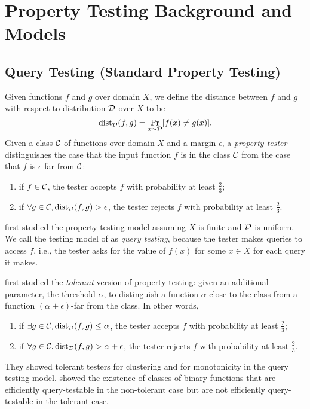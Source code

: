 \section{Property Testing Background and Models}
\label{sec:model}
\subsection{Query Testing (Standard Property Testing)}
Given functions $f$ and $g$ over domain $X$, we define the distance between $f$ and $g$ with respect to distribution ${\mathcal{D}}$ over $X$ to be
\begin{equation}
{\mathrm{dist}}_{\mathcal{D}}(f,g)=\Pr_{x\sim{\mathcal{D}}}[f(x)\neq g(x)].
\end{equation}
Given a class ${\mathcal{C}}$ of functions over domain $X$ and a margin $\epsilon$, a \emph{property tester} distinguishes the case that the input function $f$ is in the class ${\mathcal{C}}$ from the case that $f$ is $\epsilon$-far from ${\mathcal{C}}$:
\begin{enumerate}
\item if $f\in{\mathcal{C}}$, the tester accepts $f$ with probability at least $\frac{2}{3}$;
\item if $\forall g\in{\mathcal{C}},{\mathrm{dist}}_{\mathcal{D}}(f,g)>\epsilon$, the tester rejects $f$ with probability at least $\frac{2}{3}$.
\end{enumerate}
\citet{RS96} first studied the property testing model assuming $X$ is finite and ${\mathcal{D}}$ is uniform. We call the testing model of \citet{RS96} as \emph{query testing}, because the tester makes queries to access $f$, i.e., the tester asks for the value of $f(x)$ for some $x\in X$ for each query it makes.

\citet{PRR06} first studied the \emph{tolerant} version of property testing: given an additional parameter, the threshold $\alpha$, to distinguish a function $\alpha$-close to the class from a function $(\alpha+\epsilon)$-far from the class. In other words, 
\begin{enumerate}
\item if $\exists g\in {\mathcal{C}},{\mathrm{dist}}_{\mathcal{D}}(f,g)\leq\alpha$, the tester accepts $f$ with probability at least $\frac{2}{3}$;
\item if $\forall g\in{\mathcal{C}},{\mathrm{dist}}_{\mathcal{D}}(f,g)>\alpha+\epsilon$, the tester rejects $f$ with probability at least $\frac{2}{3}$.
\end{enumerate}
They showed tolerant testers for clustering and for monotonicity in the query testing model. \citet{FF05} showed the existence of classes of binary functions that are efficiently query-testable in the non-tolerant case but are not efficiently query-testable in the tolerant case.


